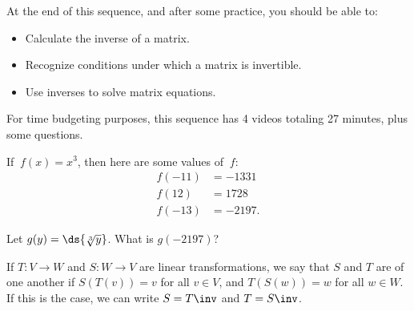 







At the end of this sequence, and after some practice, you should be able to:

\begin{itemize}
\item Calculate the inverse of a matrix.  
\item Recognize conditions under which a matrix is invertible.   
\item Use inverses to solve matrix equations.  
\end{itemize}


For time budgeting purposes, this sequence has 4 videos totaling 27 minutes, 
plus some questions.  




\endedxtext

\endedxvertical





If $\ f(x) = x^3$, then here are some values of $\ f$:
\begin{align*} f(-11) &= -1331 \\ f(12) &= 1728 \\  f(-13) &= -2197. \end{align*}  

Let $g(y) = \ds{\sqrt[3]{y}}$.  What is $g(-2197)$?



\endedxproblem



\endedxvertical





{}  
If $T: V \rightarrow W$ and $S: W \rightarrow V$ are linear transformations, we say that
$S$ and $T$ are {} of one another if $S(T(v)) = v$ for all $v\in V$, and
$T(S(w)) = w$ for all $w\in W$.  If this is the case, we can write $S = T\inv$ and $T = S\inv$.  

